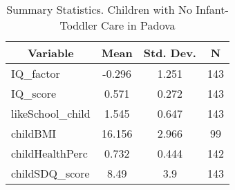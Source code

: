 
\begin{table}[htbp]\centering \caption{Summary Statistics. Children with No Infant-Toddler Care in Padova \label{bothChildasiloNonePadova}}
\begin{tabular}{l c c  c}\hline\hline
\multicolumn{1}{c}{\textbf{Variable}} & \textbf{Mean}
 & \textbf{Std. Dev.} & \textbf{N}\\ \hline
IQ\_factor & -0.296 & 1.251  & 143\\
IQ\_score & 0.571 & 0.272  & 143\\
likeSchool\_child & 1.545 & 0.647  & 143\\
childBMI & 16.156 & 2.966  & 99\\
childHealthPerc & 0.732 & 0.444  & 142\\
childSDQ\_score & 8.49 & 3.9  & 143\\
\hline\end{tabular}
\end{table}
